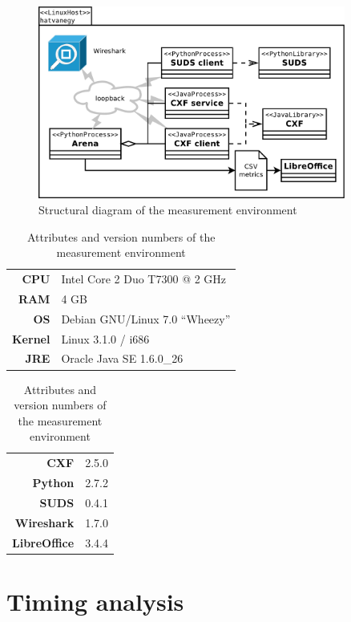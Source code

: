 \begin{figure}[htbp]
 \centering
 \includegraphics[width=0.9\textwidth]{images/measurenv.pdf}
 \caption{Structural diagram of the measurement environment}
 \label{fig:measurenv}
\end{figure}

\begin{table}[htbp]
 \centering
 \toprule
 \begin{minipage}[t]{0.55\linewidth}
  \centering
  \begin{tabular}{rl}
  \textbf{CPU} & Intel Core 2 Duo T7300 @ 2 GHz \\
  \textbf{RAM} & 4 GB \\
  \textbf{OS} & Debian GNU/Linux 7.0 ``Wheezy'' \\
  \textbf{Kernel} & Linux 3.1.0 / i686 \\
  \textbf{JRE} & Oracle Java SE 1.6.0\_26 \\
  \end{tabular}
 \end{minipage}
 \begin{minipage}[t]{0.3\linewidth}
  \centering
  \begin{tabular}{rl}
  \textbf{CXF} & 2.5.0 \\
  \textbf{Python} & 2.7.2 \\
  \textbf{SUDS} & 0.4.1 \\
  \textbf{Wireshark} & 1.7.0 \\
  \textbf{LibreOffice} & 3.4.4
  \end{tabular}
 \end{minipage}
 \bottomrule
 \caption{Attributes and version numbers of the measurement environment}
 \label{tab:measurenv}
\end{table}

\section{Timing analysis}


